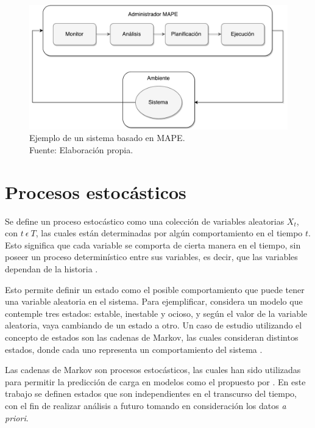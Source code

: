 \begin{figure}[!ht]
	\centering
	\includegraphics[scale=0.55]{images/MAPE.pdf}
	\caption[Ejemplo de un sistema basado en MAPE.]{Ejemplo de un sistema basado en MAPE.\\Fuente: Elaboraci\'on propia.}
	\label{fig:mape}
\end{figure}

\section{Procesos estoc\'asticos}
\label{sec:procesosEstocasticos}

Se define un proceso estoc\'astico como una colecci\'on de variables aleatorias {$X_t$, con $t ~ \epsilon ~ T$}, las cuales est\'an determinadas por alg\'un comportamiento en el tiempo $t$. Esto significa que cada variable se comporta de cierta manera en el tiempo, sin poseer un proceso determin\'istico entre sus variables, es decir, que las variables dependan de la historia \citep{taylor2014introduction}.

Esto permite definir un estado como el posible comportamiento que puede tener una variable aleatoria en el sistema. Para ejemplificar, considera un modelo que contemple tres estados: estable, inestable y ocioso, y seg\'un el valor de la variable aleatoria, vaya cambiando de un estado a otro. Un caso de estudio utilizando el concepto de estados son las cadenas de Markov, las cuales consideran distintos estados, donde cada uno representa un comportamiento del sistema \citep{de1978calculus}.

Las cadenas de Markov son procesos estoc\'asticos, las cuales han sido utilizadas para permitir la predicci\'on de carga en modelos como el propuesto por \citep{GongGW10}. En este trabajo se definen estados que son independientes en el transcurso del tiempo, con el fin de realizar an\'alisis a futuro tomando en consideraci\'on los datos \textit{a priori}.

